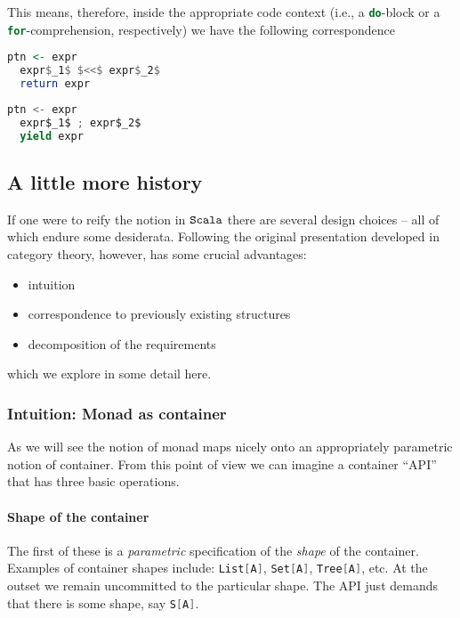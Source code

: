 This means, therefore, inside the appropriate code context (i.e., a
\lstinline[language=Haskell]!do!-block or a
\lstinline[language=Scala]!for!-comprehension, respectively) we have
the following correspondence

\begin{center}
%
\begin{minipage}{2.1764in}
\begin{lstlisting}[language=Haskell,mathescape=true]
  ptn <- expr
  expr$_1$ $<<$ expr$_2$
  return expr
\end{lstlisting}
\end{minipage}
%
\begin{minipage}{2.1764in}
\begin{lstlisting}[language=Scala,mathescape=true]
  ptn <- expr
  expr$_1$ ; expr$_2$
  yield expr
\end{lstlisting}
\end{minipage}
%
\end{center}

\subsection{A little more history}

If one were to reify the notion in $\texttt{Scala}$ there are several design
choices -- all of which endure some desiderata. Following the original
presentation developed in category theory, however, has some crucial
advantages:

\begin{itemize}
  \item intuition
  \item correspondence to previously existing structures
  \item decomposition of the requirements 
\end{itemize}

which we explore in some detail here.

\subsubsection{Intuition: Monad as container}

As we will see the notion of monad maps nicely onto an appropriately
parametric notion of container. From this point of view we can imagine
a container ``API'' that has three basic operations. 
\paragraph{Shape of the container} The first of these is a
\emph{parametric} specification of the \emph{shape} of the
container. Examples of container shapes include: \lstinline[language=Scala]!List[A]!,
\lstinline[language=Scala]!Set[A]!, \lstinline[language=Scala]!Tree[A]!, etc. At the outset we remain
uncommitted to the particular shape. The API just demands that
there is some shape, say \lstinline[language=Scala]!S[A]!.
